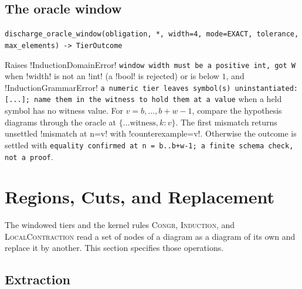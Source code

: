 \subsection{The oracle window}\label{sec:kernel-tier-oracle}

\begin{signature}
\texttt{discharge\_\allowbreak{}oracle\_\allowbreak{}window(\allowbreak{}obligation,\allowbreak{} *,\allowbreak{} width=4,\allowbreak{} mode=EXACT,\allowbreak{} tolerance,\allowbreak{} max\_\allowbreak{}elements) -> TierOutcome}

Raises \py!InductionDomainError! \texttt{window width must be a positive int,\allowbreak{} got W} when \code!width! is not an \py!int! (a \py!bool! is rejected) or is below $1$, and \py!InductionGrammarError! \texttt{a numeric tier leaves symbol(\allowbreak{}s) uninstantiated: [.\allowbreak{}.\allowbreak{}.\allowbreak{}]; name them in the witness to hold them at a value} when a held symbol has no witness value. For $v=b,\ldots,b+w-1$, compare the hypothesis diagrams through the oracle at $\{\ldots\text{witness}, k: v\}$. The first mismatch returns unsettled \code!mismatch at n=v! with \py!counterexample=v!. Otherwise the outcome is settled with \texttt{equality confirmed at n = b.\allowbreak{}.\allowbreak{}b+w-1; a finite schema check,\allowbreak{} not a proof}.
\end{signature}

\section{Regions, Cuts, and Replacement}\label{sec:kernel-regions}

The windowed tiers and the kernel rules \textsc{Congr}, \textsc{Induction}, and \textsc{LocalContraction} read a set of nodes of a diagram as a diagram of its own and replace it by another. This section specifies those operations.

\subsection{Extraction}\label{sec:kernel-extract}

